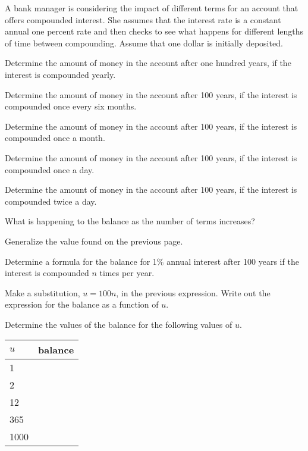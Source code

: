 \begin{problem}
\item A bank manager is considering the impact of different terms for
  an account that offers compounded interest. She assumes that the
  interest rate is a constant annual one percent rate and then checks
  to see what happens for different lengths of time between
  compounding. Assume that one dollar is initially deposited.
  \begin{subproblem}
  \item Determine the amount of money in the account after one hundred
    years, if the interest is compounded yearly.  \vfill
  \item Determine the amount of money in the account after 100 years,
    if the interest is compounded once every six months.  \vfill
  \item Determine the amount of money in the account after 100 years,
    if the interest is compounded once a month.
    \vfill
  \item Determine the amount of money in the account after 100 years,
    if the interest is compounded once a day.
    \vfill
  \item Determine the amount of money in the account after 100 years,
    if the interest is compounded twice  a day.
    \vfill    
  \item What is happening to the balance as the number of terms
    increases?
    \vfill
  \end{subproblem}
  \clearpage

\item Generalize the value found on the previous page.
  \begin{subproblem}
  \item Determine a formula for the balance for 1\% annual interest
    after 100 years if the interest is compounded $n$ times per year.
    \vfill
  \item Make a substitution, $u=100n$, in the previous
    expression. Write out the expression for the balance as a function
    of $u$.
    \vfill
  \item Determine the values of the balance for the following values
    of $u$.

    \begin{tabular}{l|l}
      $u$ & balance \\ \hline
      1    &  \\ \hline
      2    &  \\ \hline
      12   &  \\ \hline
      365  &  \\ \hline
      1000 &  \\ \hline
    \end{tabular}


\end{subproblem}
\end{problem}
